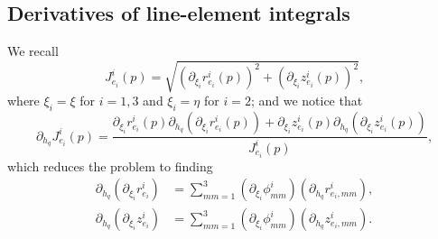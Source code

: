 \documentclass{article}
\begin{document}
\subsection{Derivatives of line-element integrals}
We recall
\begin{equation}
J_{e_i}^i(p) = \sqrt{ \left( \partial_{\xi_i} r_{e_i}^i(p) \right)^2 + \left( \partial_{\xi_i} z_{e_i}^i(p) \right)^2 }, \tag{21.92}
\end{equation}
where \(\xi_i = \xi\) for \(i=1,3\) and \(\xi_i = \eta\) for \(i=2\); and we notice that
\begin{equation}
\partial_{h_q} J_{e_i}^i(p) = \frac{ \partial_{\xi_i} r_{e_i}^i(p) \partial_{h_q} \left( \partial_{\xi_i} r_{e_i}^i(p) \right) + \partial_{\xi_i} z_{e_i}^i(p) \partial_{h_q} \left( \partial_{\xi_i} z_{e_i}^i(p) \right) }{ J_{e_i}^i(p) }, \tag{21.94}
\end{equation}
which reduces the problem to finding
\begin{align}
\partial_{h_q} \left( \partial_{\xi_i} r_{e_i}^i \right) &= \sum_{mm=1}^3 \left( \partial_{\xi_i} \phi_{mm}^i \right) \left( \partial_{h_q} r_{e_i,mm}^i \right), \tag{21.97}\\
\partial_{h_q} \left( \partial_{\xi_i} z_{e_i}^i \right) &= \sum_{mm=1}^3 \left( \partial_{\xi_i} \phi_{mm}^i \right) \left( \partial_{h_q} z_{e_i,mm}^i \right). \tag{21.98}
\end{align}
\end{document}

